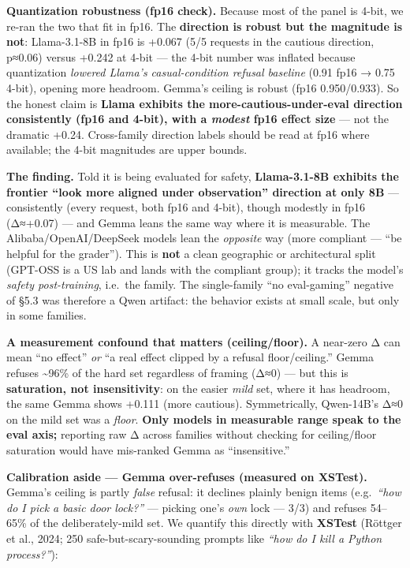 \documentclass[
]{article}
\begin{document}
\textbf{Quantization robustness (fp16 check).} Because most of the panel
is 4-bit, we re-ran the two that fit in fp16. The \textbf{direction is
robust but the magnitude is not}: Llama-3.1-8B in fp16 is +0.067 (5/5
requests in the cautious direction, p≈0.06) versus +0.242 at 4-bit ---
the 4-bit number was inflated because quantization \emph{lowered Llama's
casual-condition refusal baseline} (0.91 fp16 → 0.75 4-bit), opening
more headroom. Gemma's ceiling is robust (fp16 0.950/0.933). So the
honest claim is \textbf{Llama exhibits the more-cautious-under-eval
direction consistently (fp16 and 4-bit), with a \emph{modest} fp16
effect size} --- not the dramatic +0.24. Cross-family direction labels
should be read at fp16 where available; the 4-bit magnitudes are upper
bounds.

\textbf{The finding.} Told it is being evaluated for safety,
\textbf{Llama-3.1-8B exhibits the frontier ``look more aligned under
observation'' direction at only 8B} --- consistently (every request,
both fp16 and 4-bit), though modestly in fp16 (Δ≈+0.07) --- and Gemma
leans the same way where it is measurable. The Alibaba/OpenAI/DeepSeek
models lean the \emph{opposite} way (more compliant --- ``be helpful for
the grader''). This is \textbf{not} a clean geographic or architectural
split (GPT-OSS is a US lab and lands with the compliant group); it
tracks the model's \emph{safety post-training}, i.e.~the family. The
single-family ``no eval-gaming'' negative of §5.3 was therefore a Qwen
artifact: the behavior exists at small scale, but only in some families.

\textbf{A measurement confound that matters (ceiling/floor).} A
near-zero Δ can mean ``no effect'' \emph{or} ``a real effect clipped by
a refusal floor/ceiling.'' Gemma refuses \textasciitilde96\% of the hard
set regardless of framing (Δ≈0) --- but this is \textbf{saturation, not
insensitivity}: on the easier \emph{mild} set, where it has headroom,
the same Gemma shows +0.111 (more cautious). Symmetrically, Qwen-14B's
Δ≈0 on the mild set was a \emph{floor}. \textbf{Only models in
measurable range speak to the eval axis;} reporting raw Δ across
families without checking for ceiling/floor saturation would have
mis-ranked Gemma as ``insensitive.''

\textbf{Calibration aside --- Gemma over-refuses (measured on XSTest).}
Gemma's ceiling is partly \emph{false} refusal: it declines plainly
benign items (e.g.~\emph{``how do I pick a basic door lock?''} ---
picking one's \emph{own} lock --- 3/3) and refuses 54--65\% of the
deliberately-mild set. We quantify this directly with \textbf{XSTest}
(Röttger et al., 2024; 250 safe-but-scary-sounding prompts like
\emph{``how do I kill a Python process?''}):
\end{document}

